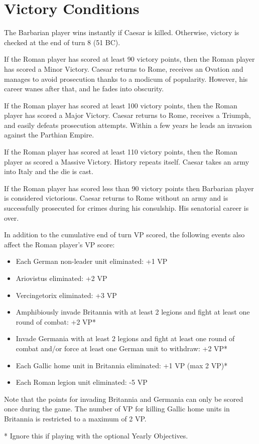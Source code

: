 \section{Victory Conditions}
\par
The Barbarian player wins instantly if Caesar is killed. Otherwise, victory is checked at the end of turn 8 (51 BC).

If the Roman player has scored at least 90 victory points, then the Roman player has scored a Minor Victory. Caesar returns to Rome, receives an Ovation and manages to avoid prosecution thanks to a modicum of popularity. However, his career wanes after that, and he fades into obscurity.

If the Roman player has scored at least 100 victory points, then the Roman player has scored a Major Victory. Caesar returns to Rome, receives a Triumph, 
and easily defeats prosecution attempts. Within a few years he leads an invasion against the Parthian Empire.

If the Roman player has scored at least 110 victory points, then the Roman player as scored a Massive Victory. History repeats itself. Caesar takes an army into Italy and the die is cast.

If the Roman player has scored less than 90 victory points then Barbarian player is considered victorious. Caesar returns to Rome without an army and is successfully prosecuted for crimes during his consulship. His senatorial career is over.

In addition to the cumulative end of turn VP scored, the following events also affect the Roman player's VP score:

\begin{itemize}
  \setlength\itemsep{0em}
  \item Each German non-leader unit eliminated: +1 VP
  \item Ariovistus eliminated: +2 VP
  \item Vercingetorix eliminated: +3 VP
  \item Amphibiously invade Britannia with at least 2 legions and fight at least one round of combat: +2 VP*
  \item Invade Germania with at least 2 legions and fight at least one round of combat and/or force at least one German unit to withdraw: +2 VP*
  \item Each Gallic home unit in Britannia eliminated: +1 VP (max 2 VP)*
  \item Each Roman legion unit eliminated: -5 VP
\end{itemize}

Note that the points for invading Britannia and Germania can only be scored once during the game. The number of VP for killing Gallic home units in Britannia is restricted to a maximum of 2 VP.

* Ignore this if playing with the optional Yearly Objectives.